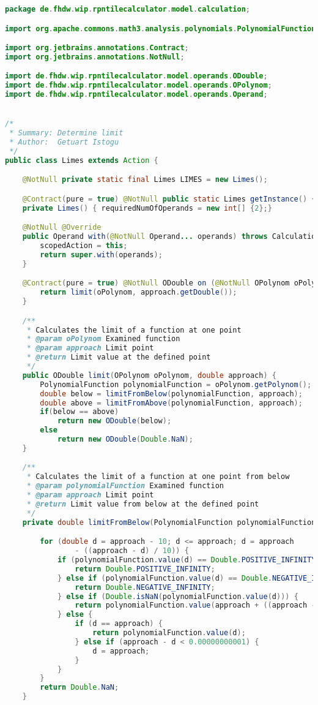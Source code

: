 \begin{lstlisting}[caption=Limes (Istogu),label=list:Limes,language=Java]
package de.fhdw.wip.rpntilecalculator.model.calculation;

import org.apache.commons.math3.analysis.polynomials.PolynomialFunction;

import org.jetbrains.annotations.Contract;
import org.jetbrains.annotations.NotNull;

import de.fhdw.wip.rpntilecalculator.model.operands.ODouble;
import de.fhdw.wip.rpntilecalculator.model.operands.OPolynom;
import de.fhdw.wip.rpntilecalculator.model.operands.Operand;


/*
 * Summary: Determine limit
 * Author:  Getuart Istogu
 */
public class Limes extends Action {

    @NotNull private static final Limes LIMES = new Limes();

    @Contract(pure = true) @NotNull public static Limes getInstance() { return LIMES; }
    private Limes() { requiredNumOfOperands = new int[] {2};}

    @NotNull @Override
    public Operand with(@NotNull Operand... operands) throws CalculationException {
        scopedAction = this;
        return super.with(operands);
    }

    @Contract(pure = true) @NotNull ODouble on (@NotNull OPolynom oPolynom, @NotNull ODouble approach) {
        return limit(oPolynom, approach.getDouble());
    }

    /**
     * Calculates the limit of a function at one point
     * @param oPolynom Examined function
     * @param approach Limit point
     * @return Limit value at the defined point
     */
    public ODouble limit(OPolynom oPolynom, double approach) {
        PolynomialFunction polynomialFunction = oPolynom.getPolynom();
        double below = limitFromBelow(polynomialFunction, approach);
        double above = limitFromAbove(polynomialFunction, approach);
        if(below == above)
            return new ODouble(below);
        else
            return new ODouble(Double.NaN);
    }

    /**
     * Calculates the limit of a function at one point from below
     * @param polynomialFunction Examined function
     * @param approach Limit point
     * @return Limit value from below at the defined point
     */
    private double limitFromBelow(PolynomialFunction polynomialFunction, double approach) {

        for (double d = approach - 10; d <= approach; d = approach
                - ((approach - d) / 10)) {
            if (polynomialFunction.value(d) == Double.POSITIVE_INFINITY) {
                return Double.POSITIVE_INFINITY;
            } else if (polynomialFunction.value(d) == Double.NEGATIVE_INFINITY) {
                return Double.NEGATIVE_INFINITY;
            } else if (Double.isNaN(polynomialFunction.value(d))) {
                return polynomialFunction.value(approach + ((approach - d) * 10));
            } else {
                if (d == approach) {
                    return polynomialFunction.value(d);
                } else if (approach - d < 0.00000000001) {
                    d = approach;
                }
            }
        }
        return Double.NaN;
    }


\end{lstlisting}
